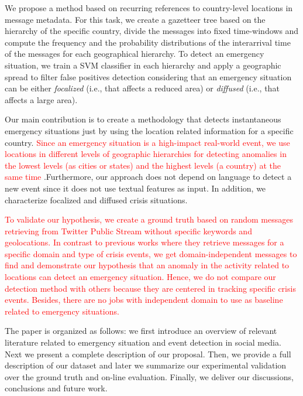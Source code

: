 \documentclass[sigconf]{acmart}
\begin{document}
We propose a method based on recurring references to country-level locations in message metadata. For this task, we create a gazetteer tree based on the hierarchy of the specific country, divide the messages into fixed time-windows and compute the frequency and the probability distributions of the interarrival time of the messages for each geographical hierarchy. To detect an emergency situation, we train a SVM classifier in each hierarchy and apply a geographic spread to filter false positives detection considering that an emergency situation can be either \textit{focalized} (i.e., that affects a reduced area) or \textit{diffused} (i.e., that affects a large area). 

Our main contribution is to create a methodology that detects instantaneous emergency situations just by using the location related information for a specific country. \textcolor{red}{Since an emergency situation is a high-impact real-world event, we use locations in different levels of geographic hierarchies for detecting anomalies in the lowest levels (as cities or states) and the highest levels (a country) at the same time} .Furthermore, our approach does not depend on language to detect a new event since it does not use textual features as input. In addition, we characterize focalized and diffused crisis situations.

\textcolor{red}{To validate our hypothesis, we create a ground truth based on random messages retrieving from Twitter Public Stream without specific keywords and geolocations. In contrast to previous works where they retrieve messages for a specific domain and type of crisis events, we get domain-independent messages to find and demonstrate our hypothesis that an anomaly in the activity related to locations can detect an emergency situation. Hence, we do not compare our detection method with others because they are centered in tracking specific crisis events. Besides, there are no jobs with independent domain to use as baseline related to emergency situations.}

The paper is organized as follows: we first introduce an overview of relevant literature related to emergency situation and event detection in social media. Next we present a complete description of our proposal. Then, we provide a full description of our dataset and later we summarize our experimental validation over the ground truth and on-line evaluation. Finally, we deliver our discussions, conclusions and future work.
\end{document}
